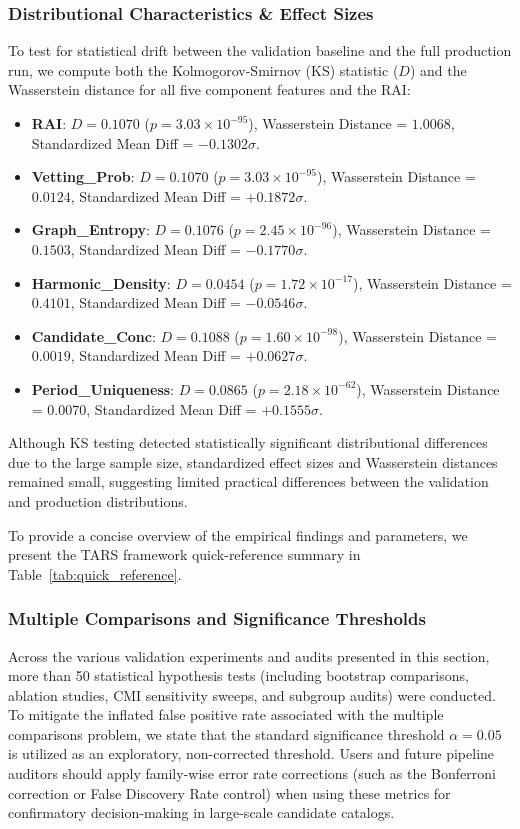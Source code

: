 \subsubsection{Distributional Characteristics \& Effect Sizes}
To test for statistical drift between the validation baseline and the full production run, we compute both the Kolmogorov-Smirnov (KS) statistic ($D$) and the Wasserstein distance for all five component features and the RAI:
\begin{itemize}
    \item \textbf{RAI}: $D = 0.1070$ ($p = 3.03 \times 10^{-95}$), Wasserstein Distance = $1.0068$, Standardized Mean Diff = $-0.1302\sigma$.
    \item \textbf{Vetting\_Prob}: $D = 0.1070$ ($p = 3.03 \times 10^{-95}$), Wasserstein Distance = $0.0124$, Standardized Mean Diff = $+0.1872\sigma$.
    \item \textbf{Graph\_Entropy}: $D = 0.1076$ ($p = 2.45 \times 10^{-96}$), Wasserstein Distance = $0.1503$, Standardized Mean Diff = $-0.1770\sigma$.
    \item \textbf{Harmonic\_Density}: $D = 0.0454$ ($p = 1.72 \times 10^{-17}$), Wasserstein Distance = $0.4101$, Standardized Mean Diff = $-0.0546\sigma$.
    \item \textbf{Candidate\_Conc}: $D = 0.1088$ ($p = 1.60 \times 10^{-98}$), Wasserstein Distance = $0.0019$, Standardized Mean Diff = $+0.0627\sigma$.
    \item \textbf{Period\_Uniqueness}: $D = 0.0865$ ($p = 2.18 \times 10^{-62}$), Wasserstein Distance = $0.0070$, Standardized Mean Diff = $+0.1555\sigma$.
\end{itemize}
Although KS testing detected statistically significant distributional differences due to the large sample size, standardized effect sizes and Wasserstein distances remained small, suggesting limited practical differences between the validation and production distributions.

To provide a concise overview of the empirical findings and parameters, we present the TARS framework quick-reference summary in Table~\ref{tab:quick_reference}.



\subsubsection{Multiple Comparisons and Significance Thresholds}
Across the various validation experiments and audits presented in this section, more than 50 statistical hypothesis tests (including bootstrap comparisons, ablation studies, CMI sensitivity sweeps, and subgroup audits) were conducted. To mitigate the inflated false positive rate associated with the multiple comparisons problem, we state that the standard significance threshold $\alpha = 0.05$ is utilized as an exploratory, non-corrected threshold. Users and future pipeline auditors should apply family-wise error rate corrections (such as the Bonferroni correction or False Discovery Rate control) when using these metrics for confirmatory decision-making in large-scale candidate catalogs.

